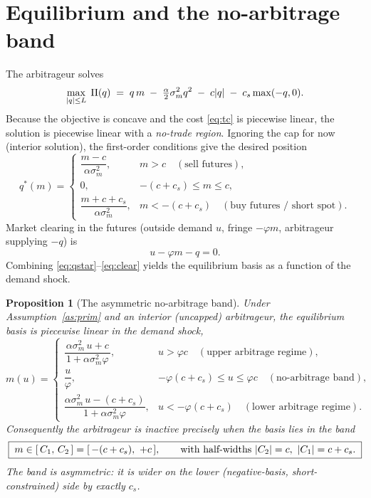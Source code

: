 \documentclass[11pt,a4paper]{article}
\DeclarePairedDelimiter{\abs}{\lvert}{\rvert}
\theoremstyle{plain}
\newtheorem{proposition}{Proposition}
\theoremstyle{definition}
\theoremstyle{remark}
\begin{document}
\section{Equilibrium and the no-arbitrage band}\label{sec:band}
The arbitrageur solves
\begin{equation}
\max_{\abs{q}\le L}\; \Pi(q) \;=\; q\,m \;-\; \tfrac{\alpha}{2}\sigma_m^2 q^2 \;-\; c\abs{q} \;-\; c_s\max(-q,0). \label{eq:arbprob}
\end{equation}
Because the objective is concave and the cost \eqref{eq:tc} is piecewise linear, the solution is piecewise linear with a \emph{no-trade region}. Ignoring the cap for now (interior solution), the first-order conditions give the desired position
\begin{equation}
q^\ast(m) = \begin{cases} \dfrac{m-c}{\alpha\sigma_m^2}, & m > c \quad(\text{sell futures}),\\[8pt] 0, & -(c+c_s)\le m \le c,\\[6pt] \dfrac{m+c+c_s}{\alpha\sigma_m^2}, & m < -(c+c_s)\quad(\text{buy futures / short spot}). \end{cases} \label{eq:qstar}
\end{equation}
Market clearing in the futures (outside demand $u$, fringe $-\varphi m$, arbitrageur supplying $-q$) is
\begin{equation}
u - \varphi m - q = 0. \label{eq:clear}
\end{equation}
Combining \eqref{eq:qstar}--\eqref{eq:clear} yields the equilibrium basis as a function of the demand shock.

\begin{proposition}[The asymmetric no-arbitrage band]\label{prop:band}
Under Assumption~\ref{as:prim} and an interior (uncapped) arbitrageur, the equilibrium basis is piecewise linear in the demand shock,
\begin{equation}
m(u) = \begin{cases} \dfrac{\alpha\sigma_m^2\,u + c}{\,1+\alpha\sigma_m^2\varphi\,}, & u > \varphi c \quad(\text{upper arbitrage regime}),\\[10pt] \dfrac{u}{\varphi}, & -\varphi(c+c_s)\le u \le \varphi c \quad(\text{no-arbitrage band}),\\[8pt] \dfrac{\alpha\sigma_m^2\,u - (c+c_s)}{\,1+\alpha\sigma_m^2\varphi\,}, & u < -\varphi(c+c_s)\quad(\text{lower arbitrage regime}). \end{cases} \label{eq:mofu}
\end{equation}
Consequently the arbitrageur is inactive precisely when the basis lies in the band
\begin{equation}
\boxed{\; m \in [\,C_1,\,C_2\,] = [\,-(c+c_s),\ +c\,], \qquad \text{with half-widths } \abs{C_2}=c,\ \abs{C_1}=c+c_s. \;}
\end{equation}
The band is \emph{asymmetric}: it is wider on the lower (negative-basis, short-constrained) side by exactly $c_s$.
\end{proposition}
\end{document}
